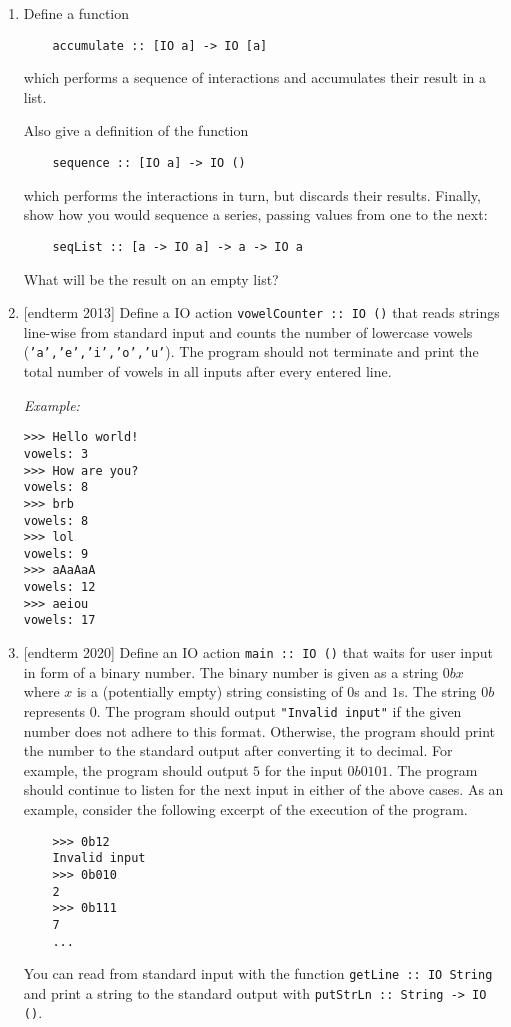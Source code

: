 \documentclass{article}
\def\code#1{\texttt{#1}}
\begin{document}
\begin{enumerate}
    \item \cite[p. 461]{thompson} Define a function
        \begin{verbatim}
    accumulate :: [IO a] -> IO [a]
        \end{verbatim}
        which performs a sequence of interactions and accumulates their result in a list. \par
        Also give a definition of the function
        \begin{verbatim}
    sequence :: [IO a] -> IO ()
        \end{verbatim}
        which performs the interactions in turn, but discards their results. Finally, show how you would sequence a series, passing values from one to the next:
        \begin{verbatim}
    seqList :: [a -> IO a] -> a -> IO a
        \end{verbatim}
        What will be the result on an empty list?

    \item {[endterm 2013]} Define a IO action \code{vowelCounter :: IO ()} that reads strings line-wise from standard input and counts the number of lowercase vowels (\code{'a','e','i','o','u'}). The program should not terminate and print the total number of vowels in all inputs after every entered line. \par
        \textit{Example:}
        \begin{verbatim}
>>> Hello world!
vowels: 3
>>> How are you?
vowels: 8
>>> brb
vowels: 8
>>> lol
vowels: 9
>>> aAaAaA
vowels: 12
>>> aeiou
vowels: 17
        \end{verbatim}

    \item {[endterm 2020]} Define an IO action \code{main :: IO ()} that waits for user input in form of a binary number. The binary number is given as a string $0bx$ where $x$ is a (potentially empty) string consisting of $0$s and $1$s. The string $0b$ represents $0$. The program should output \code{"Invalid input"} if the given number does not adhere to this format. Otherwise, the program should print the number to the standard output after converting it to decimal. For example, the program should output $5$ for the input $0b0101$. The program should continue to listen for the next input in either of the above cases. As an example, consider the following excerpt of the execution of the program.
        \begin{verbatim}
    >>> 0b12
    Invalid input
    >>> 0b010
    2
    >>> 0b111
    7
    ...
        \end{verbatim}
        You can read from standard input with the function \code{getLine :: IO String} and print a string to the standard output with \code{putStrLn :: String -> IO ()}.
\end{enumerate}
\end{document}
